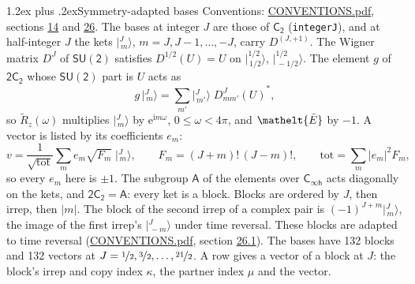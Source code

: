 \documentclass[10pt,a4paper]{article}
\makeatletter
\renewcommand\section{\@startsection{section}{1}{\z@}{-3ex plus -1ex minus -.2ex}%
  {1.2ex plus .2ex}{\normalfont\large\sffamily\bfseries\color{parttitle}}}
\numberwithin{equation}{section}
\newcommand{\eltfont}[1]{{\let\sigma\eltsigma\mathelt{#1}}}
\newcommand{\grp}[1]{\mathsf{#1}}
\newcommand{\elt}[1]{\eltfont{#1}}
\newcommand{\iunit}{\mathrm{i}}
\newcommand{\expe}{\mathrm{e}}
\newcommand{\irrJp}[2]{D^{(#1,#2)}}
\newcommand{\wignerD}[1]{D^{#1}}
\newcommand{\conj}[1]{{#1}^{*}}
\newcommand{\mult}{\kappa}
\newcommand{\intx}{\mu}
\newcommand{\jm}[2]{\bigl\lvert{}^{#1}_{\,#2}\bigr\rangle}
\newcommand{\barred}[1]{\bar{#1}}
\newcommand{\lift}[1]{\tilde{#1}}
\makeatother
\begin{document}
\section{Symmetry-adapted bases}\label{s:bases}
Conventions: \href{../../CONVENTIONS.pdf}{CONVENTIONS.pdf}, sections \href{../../../rotation/CONVENTIONS.pdf\#conv.14}{14} and \href{../../CONVENTIONS.pdf\#conv.26}{26}.
\leavevmode\label{n:index.m}\label{n:vector.ket}The bases at integer $J$ are those of \href{../../../rotation/data/pdf/C2.pdf}{$\grp{C_{2}}$} (\texttt{integerJ}), and at half-integer $J$ the kets $\jm{J}{m}$, $m = J, J-1, \dots, -J$, carry $\irrJp{J}{+1}$. \label{n:matrix.wigner}The Wigner matrix $\wignerD{J}$ of $\grp{SU(2)}$ satisfies $\wignerD{1/2}(U) = U$ on $\jm{1/2}{1/2}$, $\jm{1/2}{-1/2}$. The element $g$ of $\grp{2C_{2}}$ whose $\grp{SU(2)}$ part is $U$ acts as
\begin{equation}\label{e:action}g\,\jm{J}{m} = \sum_{m'} \jm{J}{m'}\; \conj{\wignerD{J}_{m m'}(U)},\end{equation}
so $\lift{R}_{z}(\omega)$ multiplies $\jm{J}{m}$ by $\expe^{\iunit m\omega}$, $0 \le \omega < 4\pi$, and $\elt{\barred{E}}$ by $-1$. \label{n:index.ketcoefficient}\label{n:vector.basis.symmetry}\label{n:index.ketweight}\label{n:index.total}A vector is listed by its coefficients $e_m$:
\begin{equation}\label{e:ket}v = \frac{1}{\sqrt{\mathrm{tot}}}\sum_m e_m\sqrt{F_m}\;\jm{J}{m},\qquad F_m = (J+m)!\,(J-m)!,\qquad \mathrm{tot} = \sum_m |e_m|^2F_m,\end{equation}
so every $e_m$ here is $\pm 1$.
\leavevmode\label{n:group.A}The subgroup $\grp{A}$ of the elements over $\grp{C_{\infty h}}$ acts diagonally on the kets, and $\grp{2C_{2}} = \grp{A}$: every ket is a block. Blocks are ordered by $J$, then irrep, then $|m|$. The block of the second irrep of a complex pair is $(-1)^{J+m}\jm{J}{m}$, the image of the first irrep's $\jm{J}{-m}$ under time reversal. These blocks are adapted to time reversal (\href{../../CONVENTIONS.pdf}{CONVENTIONS.pdf}, section \href{../../CONVENTIONS.pdf\#conv.26.1}{26.1}).
The bases have 132 blocks and 132 vectors at $J = \nicefrac{1}{2}, \nicefrac{3}{2}, \dots, \nicefrac{21}{2}$. \label{n:index.copy}\label{n:head.vector}A row gives a vector of a block at $J$: the block's irrep and copy index $\mult$, the partner index $\intx$ and the vector.
\end{document}
